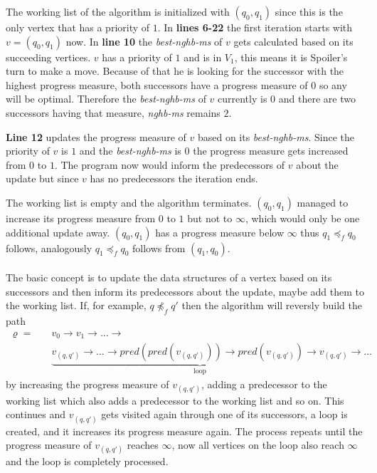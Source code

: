 \documentclass[12pt,oneside,bibliography=totoc,abstracton]{scrartcl}
\begin{document}
The working list of the algorithm is initialized with $(q_0, q_1)$ since this is the only vertex that has a priority of $1$.
In \textbf{lines 6-22} the first iteration starts with $v = (q_0, q_1)$ now. In \textbf{line 10} the \textit{best-nghb-ms}
of $v$ gets calculated based on its succeeding vertices. $v$ has a priority of $1$ and is in $V_1$,
this means it is Spoiler's turn to make a move. Because of that he is looking for the successor
with the highest progress measure, both successors have a progress measure of $0$ so any will be optimal.
Therefore the \textit{best-nghb-ms} of $v$ currently is $0$ and there are two successors having that measure,
\textit{nghb-ms} remains $2$.

\textbf{Line 12} updates the progress measure of $v$ based on its \textit{best-nghb-ms}.
Since the priority of $v$ is $1$ and the \textit{best-nghb-ms} is $0$ the progress measure gets increased from $0$ to $1$.
The program now would inform the predecessors of $v$ about the update but since $v$ has no predecessors the iteration ends.

The working list is empty and the algorithm terminates. $(q_0, q_1)$ managed to increase its progress measure from $0$ to $1$
but not to $\infty$, which would only be one additional update away. $(q_0, q_1)$ has a progress measure below $\infty$
thus $q_1 \preceq_f q_0$ follows, analogously $q_1 \preceq_f q_0$ follows from $(q_1, q_0)$.\\\\
The basic concept is to update the data structures of a vertex based on its successors and then inform
its predecessors about the update, maybe add them to the working list. If, for example, $q \not\preceq_f q'$ then
the algorithm will reversly build the path
\begin{align*}
	\varrho =	&\quad v_0 \rightarrow v_1 \rightarrow \ldots \rightarrow\\
			&\quad \underbrace{v_{(q, q')} \rightarrow \ldots \rightarrow pred(pred(v_{(q, q')})) \rightarrow
				pred(v_{(q, q')}) \rightarrow v_{(q, q')}}_{\text{loop}} \rightarrow \ldots
\end{align*}
by increasing the progress measure of $v_{(q, q')}$, adding a predecessor to the working list which also
adds a predecessor to the working list and so on. This continues and $v_{(q, q')}$ gets visited again through one of
its successors, a loop is created, and it increases its progress measure again.
The process repeats until the progress measure of $v_{(q, q')}$ reaches $\infty$, now all vertices on the loop also
reach $\infty$ and the loop is completely processed.
\end{document}
